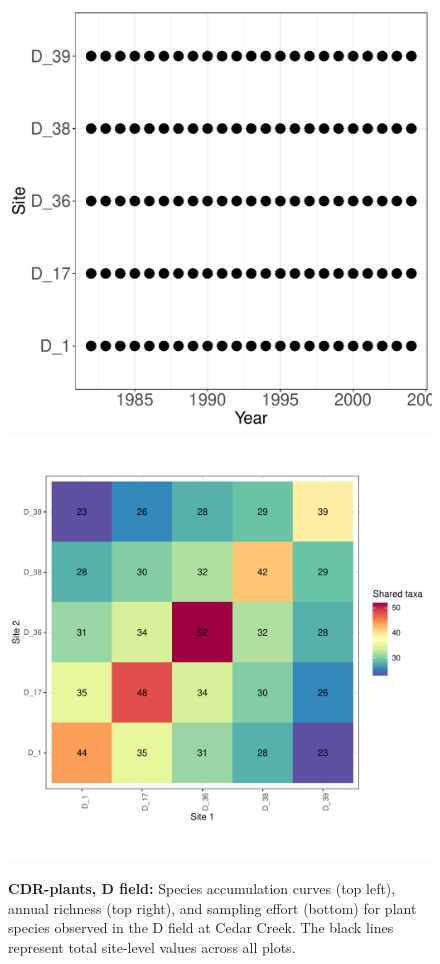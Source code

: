 \documentclass[11pt, oneside]{article}
\begin{document}
\begin{figure}[h!]
\includegraphics[scale = 0.4]{cdr-plantsD-compagnoni_spatiotemporal_sampling_effort.pdf}
\includegraphics[scale = 0.4]{cdr-plantsD-compagnoni_spp_shared.pdf}
\caption{{\bf CDR-plants, D field:} Species accumulation curves (top left),  annual richness (top right), and sampling effort (bottom)  for plant species observed in the D field at Cedar Creek. The black lines represent total site-level values across all plots.}
\label{cdrD-plants}
\end{figure}
\end{document}
